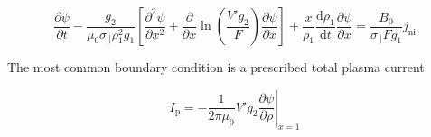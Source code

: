 \[\frac{{\partial \psi }}{{\partial t}} - \frac{{{g_2}}}{{{\mu _0}{\sigma _\parallel }\rho _{\text{1}}^2{g_1}}}\left[ {\frac{{{\partial ^2}\psi }}{{\partial {x^2}}} + \frac{\partial }{{\partial x}}\ln \left( {\frac{{V'{g_2}}}{F}} \right)\frac{{\partial \psi }}{{\partial x}}} \right] + \frac{x}{{{\rho _1}}}\frac{{{\text{d}}{\rho _1}}}{{{\text{d}}t}}\frac{{\partial \psi }}{{\partial x}} = \frac{{{B_0}}}{{{\sigma _\parallel }F{g_1}}}{j_{{\text{ni}}}}\]

The most common boundary condition is a prescribed total plasma current

\[{I_{\text{p}}} = {\left. { - \frac{1}{{2\pi {\mu _0}}}V'{g_2}\frac{{\partial \psi }}{{\partial \rho }}} \right|_{x = 1}}\]

